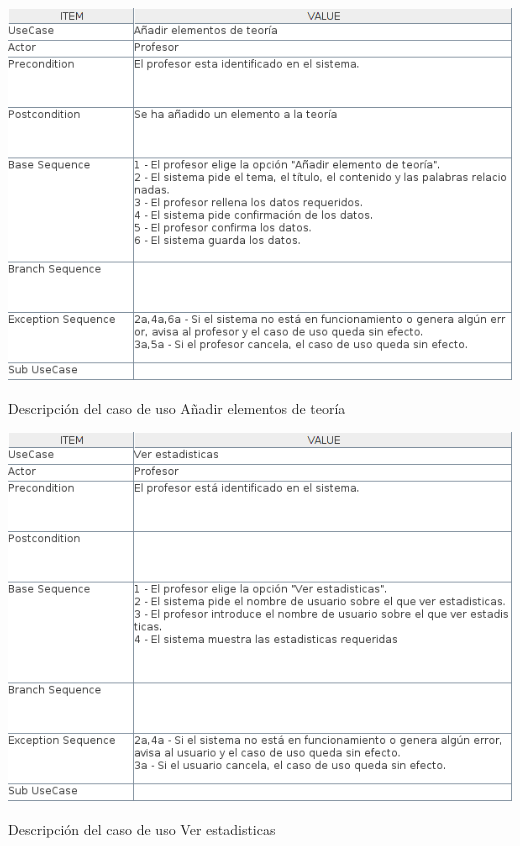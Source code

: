 \documentclass[openright,twoside,10pt]{book}
\begin{document}
    \vspace*{\fill}
    
    \newpage
    
    \vspace*{\fill}
    
    \begin{table}[H]
        \begin{center}
            \includegraphics[width=\textwidth]{img/astah/analisis/casos_de_uso/useCase06.png}
        \end{center}
        \caption{Descripción del caso de uso Añadir elementos de teoría}
    \end{table}
    
    \vspace*{\fill}
    
    \newpage
    
    \vspace*{\fill}
    
    \begin{table}[H]
        \begin{center}
            \includegraphics[width=\textwidth]{img/astah/analisis/casos_de_uso/useCase07.png}
        \end{center}
        \caption{Descripción del caso de uso Ver estadisticas}
    \end{table}
    
\end{document}
